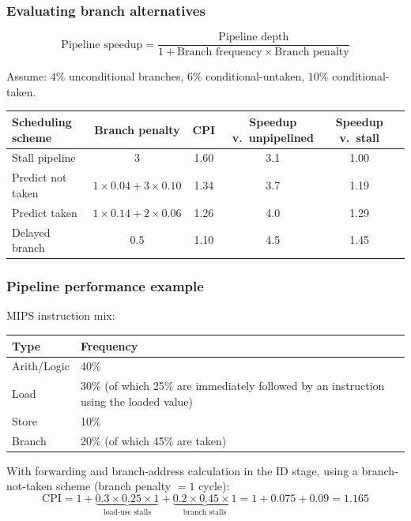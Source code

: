 \subsubsection{Evaluating branch alternatives}

\begin{prop}
\[
  \text{Pipeline speedup} = \frac{\text{Pipeline depth}}{1+\text{Branch frequency} \times \text{Branch penalty}}
\]
\end{prop}

\begin{eg}
Assume: $4\%$ unconditional branches, $6\%$ conditional-untaken, $10\%$
conditional-taken.

\begin{center}
\begin{tabular}{@{}lccccc@{}}
\toprule
Scheduling scheme & Branch penalty & CPI & Speedup v.\ unpipelined & Speedup v.\ stall \\
\midrule
Stall pipeline    & 3                         & 1.60 & 3.1 & 1.00 \\
Predict not taken & $1{\times}0.04+3{\times}0.10$ & 1.34 & 3.7 & 1.19 \\
Predict taken     & $1{\times}0.14+2{\times}0.06$ & 1.26 & 4.0 & 1.29 \\
Delayed branch    & 0.5                       & 1.10 & 4.5 & 1.45 \\
\bottomrule
\end{tabular}
\end{center}

\end{eg}

\subsubsection{Pipeline performance example}

\begin{eg}
MIPS instruction mix:

\begin{center}
\begin{tabular}{@{}lp{9.5cm}@{}}
\toprule
Type & Frequency \\
\midrule
Arith/Logic & 40\% \\
Load        & 30\% (of which 25\% are immediately followed by an instruction using the loaded value) \\
Store       & 10\% \\
Branch      & 20\% (of which 45\% are taken) \\
\bottomrule
\end{tabular}
\end{center}

With forwarding and branch-address calculation in the ID stage, using a
branch-not-taken scheme (branch penalty $=1$ cycle):
\[
  \mathrm{CPI} = 1 + \underbrace{0.3\times0.25\times1}_{\text{load-use stalls}} + \underbrace{0.2\times0.45\times1}_{\text{branch stalls}} = 1 + 0.075 + 0.09 = 1.165
\]
\end{eg}

